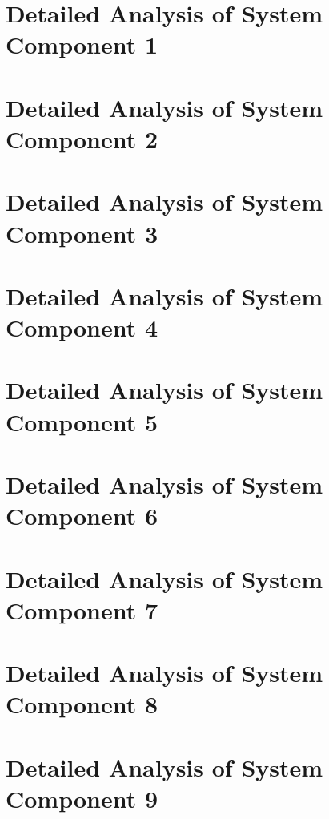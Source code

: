 \documentclass[10pt,journal,compsoc]{IEEEtran}
\begin{document}

\section{Detailed Analysis of System Component 1}
\lipsum[5-15]

\section{Detailed Analysis of System Component 2}
\lipsum[10-20]

\section{Detailed Analysis of System Component 3}
\lipsum[15-25]

\section{Detailed Analysis of System Component 4}
\lipsum[20-30]

\section{Detailed Analysis of System Component 5}
\lipsum[25-35]

\section{Detailed Analysis of System Component 6}
\lipsum[30-40]

\section{Detailed Analysis of System Component 7}
\lipsum[35-45]

\section{Detailed Analysis of System Component 8}
\lipsum[40-50]

\section{Detailed Analysis of System Component 9}
\lipsum[45-55]
\end{document}

